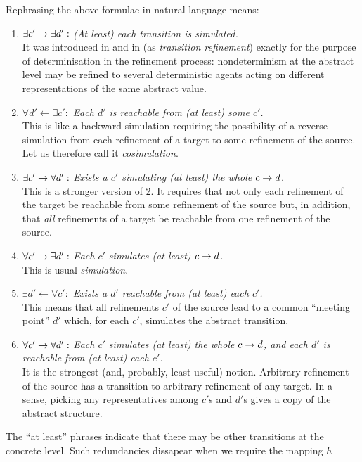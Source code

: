 Rephrasing the above formulae in natural language means: 
%
\begin{enumerate}\MyLPar
\item $\exists c' \rightarrow \exists d':$   {\em (At least) each transition is simulated.} \\
It was introduced in \cite{MeBroy} and in \cite{Wir} (as {\em transition
refinement}) exactly for the purpose of determinisation in the refinement
process: nondeterminism at the abstract level may be refined to several
deterministic agents acting on different representations of the same abstract
value.
\item $\forall d' \leftarrow \exists c':$  {\em Each $d'$ is reachable from (at least) some $c'$.} \\
This is like a backward simulation requiring  the possibility of a reverse
simulation from each refinement of a target to some refinement of the
source. Let us therefore call it {\em cosimulation}. 
\item $\exists c' \rightarrow \forall d':$ {\em Exists a $c'$ simulating (at
least) the whole ${c}\rightarrow{d}$.} \\ 
This is a stronger version of 2. It requires that not only each
refinement of the target be reachable from some refinement of the source but,
in addition, that {\em all} refinements of a target be reachable from one
refinement of the source.
\item $\forall c' \rightarrow \exists d' :$ {\em Each $c'$ simulates (at least)   ${c}\rightarrow{d}$.} \\
This is usual {\em simulation}.
\item $\exists d' \leftarrow \forall c' :$ {\em Exists a $d'$ reachable from
(at least) each $c'$.} \\
This means that all refinements $c'$ of the source lead to a common ``meeting point''
 $d'$ which, for each $c'$,  simulates the abstract transition. 
\item $\forall c' \rightarrow \forall d' :$ {\em Each $c'$ simulates (at
least) the whole ${c}\rightarrow{d}$, and each $d'$ is reachable from (at least) each $c'$.} \\
It is the strongest (and, probably, least useful) notion. Arbitrary
refinement of the  source has a transition to arbitrary refinement of any
target. In a sense, picking any representatives among $c'$s and $d'$s gives a
copy of the abstract structure.
\end{enumerate}
\noindent
The ``at least'' phrases indicate that there may be other transitions at the
concrete level. Such redundancies dissapear when we require the mapping $h$
